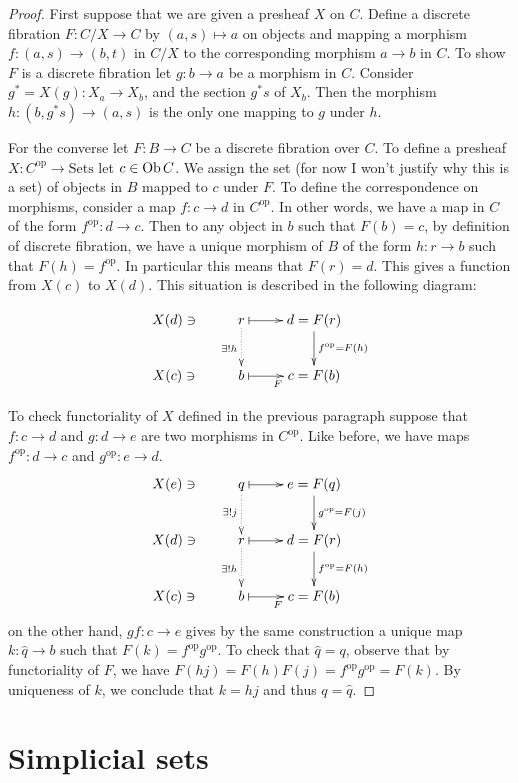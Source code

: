 \begin{proof}
First suppose that we are given a presheaf
$X$ on $C$. Define a discrete
fibration $F:C/X \to C$ by $(a,s)\mapsto a$
on objects and
mapping a morphism $f:(a,s)\to (b,t)$ in
$C/X$ to the
corresponding morphism $a \to b$ in $C$.
To show $F$ is a discrete fibration
let $g:b\to a$ be a morphism in $C$.
Consider $g^*=X(g):X_a\to X_b$,
and the section $g^*s$ of $X_b$.
Then the
morphism $h:(b,g^*s)\to (a,s)$ is the only
one mapping to $g$ under $h$.

For the converse let $F:B \to C$ be a
discrete fibration over $C$.
To define a presheaf $X:C^{\text{op}}\to
\text{Sets}$ let $c \in \mathop{\mathrm{Ob}}\nolimits C$.
We assign the set (for now I won't justify
why this is a set)
of objects in $B$ mapped to $c$ under $F$.
To define the correspondence on morphisms,
consider a map $f:c \to d$ in
$C^{\text{op}}$.
In other words, we have a map in  $C$ of the
form $f^{\text{op}}:d \to c$.
Then to any object in $b$ such that $F(b)=c$,
by definition of discrete fibration,
we have a unique morphism of $B$ of the form
$h:r \to b$ such that $F(h)=f^{\text{op}}$.
In particular this means that $F(r)=d$.
This gives a function from $X(c)$ to $X(d)$.
This situation is described in the following
diagram:

$$
\xymatrix{
X(d)\ni&r
\ar@{.>}[d]_{\exists!h}\ar@{|->}[r]& d=F(r)
\ar[d]^{f^{\text{op}}=F(h)}\\
X(c)\ni& b\ar@{|->}[r]_F&c=F(b)
}
$$




To check functoriality of $X$ defined in the
previous paragraph
suppose that $f:c\to d$ and $g:d\to e$ are
two morphisms in $C^{\text{op}}$.
Like before, we have maps $f^{\text{op}}:d\to
c$ and $g^{\text{op}}:e \to d$.
$$
\xymatrix{
X(e)\ni& q\ar@{.>}[d]_{\exists
!j}\ar@{|->}[r]& e=F(q)
\ar[d]^{g^{\text{op}}=F(j)}\\
X(d)\ni&r
\ar@{.>}[d]_{\exists!h}\ar@{|->}[r]& d=F(r)
\ar[d]^{f^{\text{op}}=F(h)}\\
X(c)\ni& b\ar@{|->}[r]_F&c=F(b)
}
$$
on the other hand, $gf:c \to e$ gives by the
same construction a unique map $k:\hat{q}
\to b$
such that $F(k)=f^{\text{op}}g^{\text{op}}$.
To check that $\hat{q}=q$, observe that
by functoriality of $F$, we have
$F(hj)=F(h)F(j)=f^{\text{op}}g^{\text{op}}=
F(k)$.
By uniqueness of $k$, we conclude that
$k=hj$ and thus $q=\hat{q}$.
\end{proof}

\section{Simplicial sets}
\label{section-simplicial-sets}

